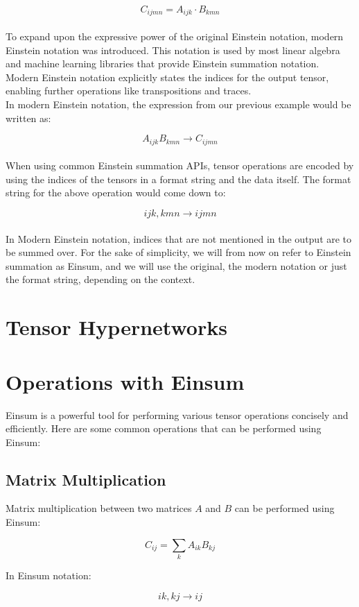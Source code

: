 \[C_{ijmn} = A_{ijk} \cdot B_{kmn}\]
\noindent
\\
To expand upon the expressive power of the original Einstein notation, modern Einstein
notation was introduced. This notation is used by most linear algebra and machine
learning libraries that provide Einstein summation notation. Modern Einstein notation
explicitly states the indices for the output tensor, enabling further operations like
transpositions and traces.\\
In modern Einstein notation, the expression from our previous example would
be written as:

\[A_{ijk}B_{kmn} \rightarrow C_{ijmn}\]
\noindent
\\
When using common Einstein summation APIs, tensor operations are encoded by using the
indices of the tensors in a format string and the data itself. 
\newpage
\noindent
The format string for the above operation would come down to:

\[ijk,kmn \rightarrow ijmn\]
\noindent
\\
In Modern Einstein notation, indices that are not mentioned in the output are to be
summed over. For the sake of simplicity, we will from now on refer to Einstein summation
as Einsum, and we will use the original, the modern notation or just the format
string, depending on the context.

\section{Tensor Hypernetworks}

\section{Operations with Einsum}

Einsum is a powerful tool for performing various tensor operations concisely and 
efficiently. Here are some common operations that can be performed using Einsum:

\subsection{Matrix Multiplication}

Matrix multiplication between two matrices $A$ and $B$ can be performed using Einsum:

\[
C_{ij} = \sum_{k} A_{ik} B_{kj}
\]

In Einsum notation:

\[
ik,kj \rightarrow ij
\]

